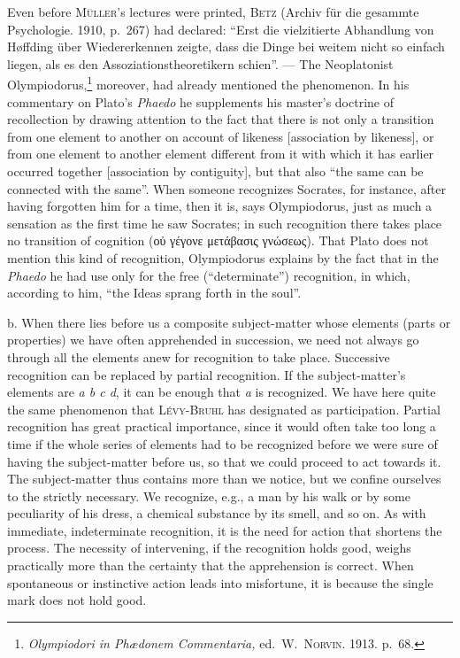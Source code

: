 \documentclass[12pt]{book}
\newcommand{\opage}[1]{\marginnote{\footnotesize\textit{[#1]}}}
\begin{document}
Even before \textsc{Müller}'s lectures were printed, \textsc{Betz} (Archiv für
die gesammte Psychologie. 1910, p.\ 267) had declared: ``Erst die vielzitierte
Abhandlung von Høffding über Wiedererkennen zeigte, dass die Dinge bei weitem
nicht so einfach liegen, als es den Assozia\-tions\-theo\-re\-tikern schien''. --- The
Neo\-pla\-tonist Olym\-pio\-dorus,\footnote{\textit{Olympiodori in Phædonem
Commentaria,} ed.\ W.\ \textsc{Norvin}. 1913. p.\ 68.} moreover, had already
mentioned the phenomenon. In his commentary on Plato's \textit{Phaedo} he
supplements his master's doctrine of recollection by drawing attention to the
fact that there is not only a transition from one element to another on account
of likeness [association by likeness], or from one element to another element
different from it \opage{20}with which it has earlier occurred together [association by
contiguity], but that also ``the same can be connected with the same''. When
someone recognizes Socrates, for instance, after having forgotten him for a
time, then it is, says Olympiodorus, just as much a sensation as the first time
he saw Socrates; in such recognition there takes place no transition of
cognition (οὐ γέγονε μετάβασις γνώσεως). That Plato does not mention this kind
of recognition, Olympiodorus explains by the fact that in the \textit{Phaedo} he
had use only for the free (``determinate'') recognition, in which, according to
him, ``the Ideas sprang forth in the soul''.

b. When there lies before us a composite subject-matter whose elements (parts or
properties) we have often apprehended in succession, we need not always go
through all the elements anew for recognition to take place. Successive
recognition can be replaced by partial recognition. If the subject-matter's
elements are \textit{a b c d}, it can be enough that \textit{a} is recognized.
We have here quite the same phenomenon that \textsc{Lévy-Bruhl} has designated
as participation. Partial recognition has great practical importance, since it
would often take too long a time if the whole series of elements had to be
recognized before we were sure of having the subject-matter before us, so that
we could proceed to act towards it. The subject-matter thus contains more than
we notice, but we confine ourselves to the strictly necessary. We recognize,
e.g., a man by his walk or by some peculiarity of his dress, a chemical
substance by its smell, and so on. As with immediate, indeterminate recognition,
it is the need for action that shortens the process. The necessity of
intervening, if the recognition holds good, weighs practically more than the
certainty that the apprehension is correct. When spontaneous or instinctive
\opage{21}action leads into misfortune, it is because the single mark does not hold good.
\end{document}
